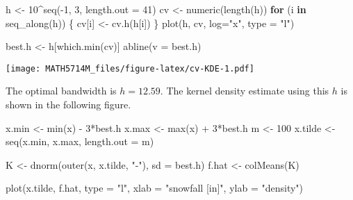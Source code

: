 \documentclass[
  a4paper,
]{article}
\newenvironment{Shaded}{\begin{snugshade}}{\end{snugshade}}
\newcommand{\AttributeTok}[1]{\textcolor[rgb]{0.77,0.63,0.00}{#1}}
\newcommand{\ControlFlowTok}[1]{\textcolor[rgb]{0.13,0.29,0.53}{\textbf{#1}}}
\newcommand{\DecValTok}[1]{\textcolor[rgb]{0.00,0.00,0.81}{#1}}
\newcommand{\FunctionTok}[1]{\textcolor[rgb]{0.00,0.00,0.00}{#1}}
\newcommand{\NormalTok}[1]{#1}
\newcommand{\OtherTok}[1]{\textcolor[rgb]{0.56,0.35,0.01}{#1}}
\newcommand{\SpecialCharTok}[1]{\textcolor[rgb]{0.00,0.00,0.00}{#1}}
\newcommand{\StringTok}[1]{\textcolor[rgb]{0.31,0.60,0.02}{#1}}
\theoremstyle{definition}
\theoremstyle{definition}
\theoremstyle{definition}
\theoremstyle{definition}
\theoremstyle{remark}
\begin{document}
\begin{Shaded}
\begin{Highlighting}[]
\NormalTok{h }\OtherTok{\textless{}{-}} \DecValTok{10}\SpecialCharTok{\^{}}\FunctionTok{seq}\NormalTok{(}\SpecialCharTok{{-}}\DecValTok{1}\NormalTok{, }\DecValTok{3}\NormalTok{, }\AttributeTok{length.out =} \DecValTok{41}\NormalTok{)}
\NormalTok{cv }\OtherTok{\textless{}{-}} \FunctionTok{numeric}\NormalTok{(}\FunctionTok{length}\NormalTok{(h))}
\ControlFlowTok{for}\NormalTok{ (i }\ControlFlowTok{in} \FunctionTok{seq\_along}\NormalTok{(h)) \{}
\NormalTok{    cv[i] }\OtherTok{\textless{}{-}} \FunctionTok{cv.h}\NormalTok{(h[i])}
\NormalTok{\}}
\FunctionTok{plot}\NormalTok{(h, cv, }\AttributeTok{log=}\StringTok{"x"}\NormalTok{, }\AttributeTok{type =} \StringTok{"l"}\NormalTok{)}

\NormalTok{best.h }\OtherTok{\textless{}{-}}\NormalTok{ h[}\FunctionTok{which.min}\NormalTok{(cv)]}
\FunctionTok{abline}\NormalTok{(}\AttributeTok{v =}\NormalTok{ best.h)}
\end{Highlighting}
\end{Shaded}

\texttt{[image: MATH5714M\_files/figure-latex/cv-KDE-1.pdf]}

The optimal bandwidth is \(h = 12.59\).
The kernel density estimate using this \(h\) is shown in the following figure.

\begin{Shaded}
\begin{Highlighting}[]
\NormalTok{x.min }\OtherTok{\textless{}{-}} \FunctionTok{min}\NormalTok{(x) }\SpecialCharTok{{-}} \DecValTok{3}\SpecialCharTok{*}\NormalTok{best.h}
\NormalTok{x.max }\OtherTok{\textless{}{-}} \FunctionTok{max}\NormalTok{(x) }\SpecialCharTok{+} \DecValTok{3}\SpecialCharTok{*}\NormalTok{best.h}
\NormalTok{m }\OtherTok{\textless{}{-}} \DecValTok{100}
\NormalTok{x.tilde }\OtherTok{\textless{}{-}} \FunctionTok{seq}\NormalTok{(x.min, x.max, }\AttributeTok{length.out =}\NormalTok{ m)}

\NormalTok{K }\OtherTok{\textless{}{-}} \FunctionTok{dnorm}\NormalTok{(}\FunctionTok{outer}\NormalTok{(x, x.tilde, }\StringTok{"{-}"}\NormalTok{), }\AttributeTok{sd =}\NormalTok{ best.h)}
\NormalTok{f.hat }\OtherTok{\textless{}{-}} \FunctionTok{colMeans}\NormalTok{(K)}

\FunctionTok{plot}\NormalTok{(x.tilde, f.hat, }\AttributeTok{type =} \StringTok{"l"}\NormalTok{,}
     \AttributeTok{xlab =} \StringTok{"snowfall [in]"}\NormalTok{, }\AttributeTok{ylab =} \StringTok{"density"}\NormalTok{)}
\end{Highlighting}
\end{Shaded}
\end{document}

